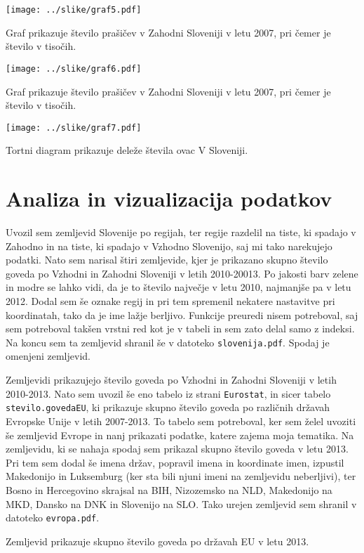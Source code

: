 \documentclass[11pt,a4paper]{article}
\begin{document}
\texttt{[image: ../slike/graf5.pdf]}

Graf prikazuje število prašičev v Zahodni Sloveniji v letu 2007, pri čemer je število v tisočih.

\texttt{[image: ../slike/graf6.pdf]}

Graf prikazuje število prašičev v Zahodni Sloveniji v letu 2007, pri čemer je število v tisočih.

\texttt{[image: ../slike/graf7.pdf]}

Tortni diagram prikazuje deleže števila ovac V Sloveniji.


\newpage
\section{Analiza in vizualizacija podatkov}
Uvozil sem zemljevid Slovenije po regijah, ter regije razdelil na tiste, ki spadajo v Zahodno in na tiste, ki spadajo v Vzhodno Slovenijo, saj mi tako narekujejo podatki. Nato sem narisal štiri zemljevide, kjer je prikazano skupno število goveda po Vzhodni in Zahodni Sloveniji v letih 2010-20013. Po jakosti barv zelene in modre se lahko vidi, da je to število največje v letu 2010, najmanjše pa v letu 2012. Dodal sem še oznake regij in pri tem spremenil nekatere nastavitve pri koordinatah, tako da je ime lažje berljivo. Funkcije preuredi nisem potreboval, saj sem potreboval takšen vrstni red kot je v tabeli in sem zato delal samo z indeksi. Na koncu sem ta zemljevid shranil še v datoteko \verb|slovenija.pdf|. Spodaj je omenjeni zemljevid.

Zemljevidi prikazujejo število goveda po Vzhodni in Zahodni Sloveniji v letih 2010-2013.
\newline
\newline
\noindent Nato sem uvozil še eno tabelo iz strani \verb|Eurostat|, in sicer tabelo \verb|stevilo.govedaEU|, ki prikazuje skupno število goveda po različnih državah Evropske Unije v letih 2007-2013. To tabelo sem potreboval, ker sem želel uvoziti še zemljevid Evrope in nanj prikazati podatke, katere zajema moja tematika. Na zemljevidu, ki se nahaja spodaj sem prikazal skupno število goveda v letu 2013. Pri tem sem dodal še imena držav, popravil imena in  koordinate imen, izpustil Makedonijo in Luksemburg (ker sta bili njuni imeni na zemljevidu neberljivi), ter Bosno in Hercegovino skrajsal na BIH, Nizozemsko na NLD, Makedonijo na MKD, Dansko na DNK in Slovenijo na SLO. Tako urejen zemljevid sem shranil v datoteko \verb|evropa.pdf|.


Zemljevid prikazuje skupno število goveda po državah EU v letu 2013.

\end{document}
